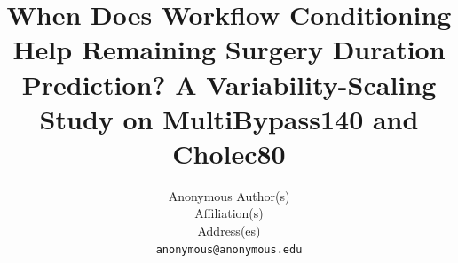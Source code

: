 \documentclass{article}
\title{When Does Workflow Conditioning Help Remaining Surgery Duration Prediction? A Variability-Scaling Study on MultiBypass140 and Cholec80}
\author{%
  Anonymous Author(s) \\
  Affiliation(s) \\
  Address(es) \\
  \texttt{anonymous@anonymous.edu}
}
\begin{document}
\maketitle

\begin{abstract}

\end{abstract}






\newpage

\end{document}
